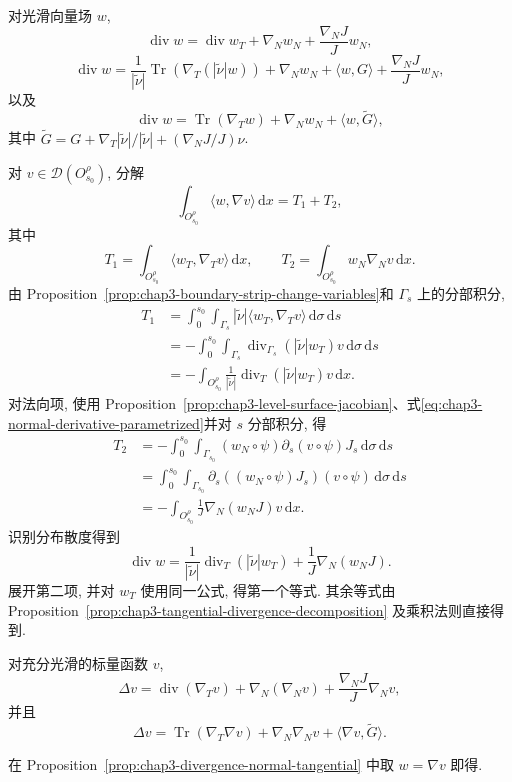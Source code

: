 \begin{Proposition}
\label{prop:chap3-divergence-normal-tangential}
对光滑向量场 $w$,
\[
 \operatorname{div}w=\operatorname{div}w_T+\nabla_Nw_N+\frac{\nabla_NJ}{J}w_N,
\]
\[
 \operatorname{div}w=\frac1{|\widetilde\nu|}
 \operatorname{Tr}(\nabla_T(|\widetilde\nu|w))
 +\nabla_Nw_N+\langle w,G\rangle+\frac{\nabla_NJ}{J}w_N,
\]
以及
\[
 \operatorname{div}w=\operatorname{Tr}(\nabla_Tw)+\nabla_Nw_N
 +\langle w,\widetilde G\rangle,
\]
其中 $\widetilde G=G+\nabla_T|\widetilde\nu|/|\widetilde\nu|+(\nabla_NJ/J)\nu$.
\end{Proposition}

\begin{Proof}
对 $v\in\mathcal D(O_{s_0}^\rho)$, 分解
\[
 \int_{O_{s_0}^\rho}\langle w,\nabla v\rangle\,\mathrm dx
 =T_1+T_2,
\]
其中
\[
 T_1=\int_{O_{s_0}^\rho}\langle w_T,\nabla_Tv\rangle\,\mathrm dx,
 \qquad T_2=\int_{O_{s_0}^\rho}w_N\nabla_Nv\,\mathrm dx.
\]
由 Proposition~\ref{prop:chap3-boundary-strip-change-variables}和 $\Gamma_s$ 上的分部积分,
\begin{align*}
 T_1
 &=\int_0^{s_0}\int_{\Gamma_s}|\widetilde\nu|
 \langle w_T,\nabla_Tv\rangle\,\mathrm d\sigma\,\mathrm ds\\
 &=-\int_0^{s_0}\int_{\Gamma_s}
 \operatorname{div}_{\Gamma_s}(|\widetilde\nu|w_T)v\,\mathrm d\sigma\,\mathrm ds\\
 &=-\int_{O_{s_0}^\rho}\frac1{|\widetilde\nu|}
 \operatorname{div}_T(|\widetilde\nu|w_T)v\,\mathrm dx.
\end{align*}
对法向项, 使用 Proposition~\ref{prop:chap3-level-surface-jacobian}、式\eqref{eq:chap3-normal-derivative-parametrized}并对 $s$ 分部积分, 得
\begin{align*}
 T_2
 &=-\int_0^{s_0}\int_{\Gamma_{s_0}}
 (w_N\circ\psi)\partial_s(v\circ\psi)J_s\,\mathrm d\sigma\,\mathrm ds\\
 &=\int_0^{s_0}\int_{\Gamma_{s_0}}
 \partial_s((w_N\circ\psi)J_s)(v\circ\psi)\,\mathrm d\sigma\,\mathrm ds\\
 &=-\int_{O_{s_0}^\rho}\frac1J\nabla_N(w_NJ)v\,\mathrm dx.
\end{align*}
识别分布散度得到
\[
 \operatorname{div}w=\frac1{|\widetilde\nu|}\operatorname{div}_T(|\widetilde\nu|w_T)
 +\frac1J\nabla_N(w_NJ).
\]
展开第二项, 并对 $w_T$ 使用同一公式, 得第一个等式. 其余等式由 Proposition~\ref{prop:chap3-tangential-divergence-decomposition} 及乘积法则直接得到.
\end{Proof}

\begin{Proposition}
\label{prop:chap3-laplacian-normal-tangential}
对充分光滑的标量函数 $v$,
\[
 \Delta v=\operatorname{div}(\nabla_Tv)+\nabla_N(\nabla_Nv)
 +\frac{\nabla_NJ}{J}\nabla_Nv,
\]
并且
\[
 \Delta v=\operatorname{Tr}(\nabla_T\nabla v)+\nabla_N\nabla_Nv
 +\langle\nabla v,\widetilde G\rangle.
\]
\end{Proposition}

\begin{Proof}
在 Proposition~\ref{prop:chap3-divergence-normal-tangential} 中取 $w=\nabla v$ 即得.
\end{Proof}
